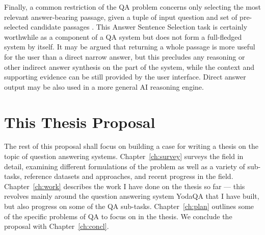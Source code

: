 Finally, a common restriction of the QA problem concerns only selecting
the most relevant answer-bearing passage, given a tuple of input question
and set of pre-selected candidate passages \cite{WangQAGrammar}.
This Answer Sentence Selection task is certainly
worthwhile as a component of a QA system but does not form a full-fledged
system by itself.
It may be argued that returning a whole passage is more useful for the user than a direct narrow answer,
but this precludes any reasoning or other indirect answer synthesis on the part of the system,
while the context and supporting evidence can be still provided by the user interface.
Direct answer output may be also used in a more general AI reasoning engine.

\section{This Thesis Proposal}

The rest of this proposal shall focus on building a case for writing
a thesis on the topic of question answering systems.
Chapter~\ref{ch:survey}
surveys the field in detail, examining different formulations of the problem
as well as a variety of sub-tasks, reference datasets and approaches,
and recent progress in the field.
Chapter~\ref{ch:work} describes
the work I have done on the thesis so far --- this revolves mainly around
the question answering system YodaQA that I have built, but also progress
on some of the QA sub-tasks.
Chapter~\ref{ch:plan} outlines some of the specific problems of QA
to focus on in the thesis.
We conclude the proposal with Chapter~\ref{ch:concl}.
